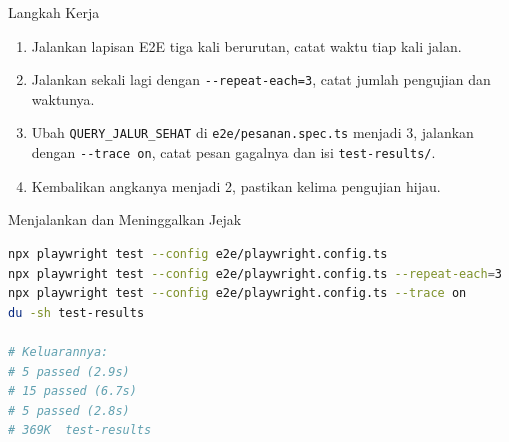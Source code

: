 \documentclass[aspectratio=169, table, 12pt]{beamer}
\begin{document}
\begin{frame}{{\Large Langkah Kerja}}
  \vspace{6pt}
  \begin{enumerate}
    \item Jalankan lapisan E2E tiga kali berurutan, catat waktu tiap kali
          jalan.
    \item Jalankan sekali lagi dengan \texttt{-{}-repeat-each=3}, catat
          jumlah pengujian dan waktunya.
    \item Ubah \texttt{QUERY\_JALUR\_SEHAT} di \texttt{e2e/pesanan.spec.ts}
          menjadi 3, jalankan dengan \texttt{-{}-trace on}, catat pesan
          gagalnya dan isi \texttt{test-results/}.
    \item Kembalikan angkanya menjadi 2, pastikan kelima pengujian hijau.
  \end{enumerate}
\end{frame}

\begin{frame}[fragile]{{\Large Menjalankan dan Meninggalkan Jejak}}
  \vspace{2pt}
\begin{lstlisting}[language=bash]
npx playwright test --config e2e/playwright.config.ts
npx playwright test --config e2e/playwright.config.ts --repeat-each=3
npx playwright test --config e2e/playwright.config.ts --trace on
du -sh test-results

# Keluarannya:
# 5 passed (2.9s)
# 15 passed (6.7s)
# 5 passed (2.8s)
# 369K  test-results
\end{lstlisting}
\end{frame}
\end{document}
